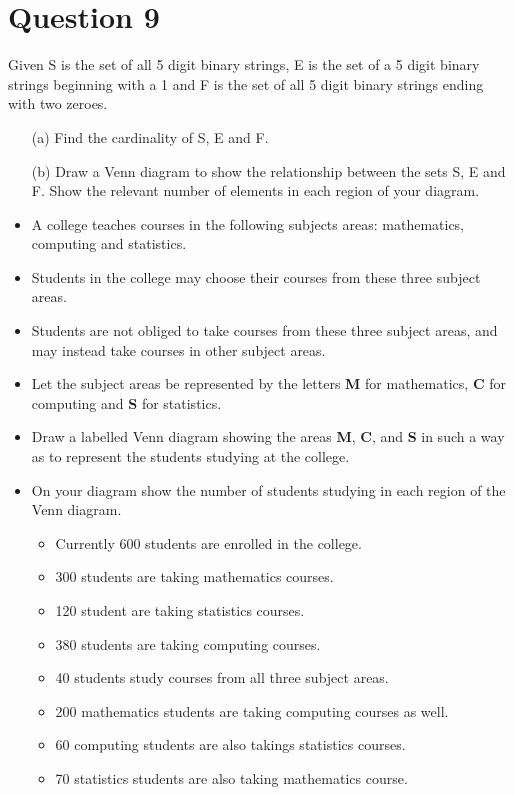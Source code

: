 \documentclass[12pt]{article} %
\begin{document}
\section*{ Question 9 }
Given S is the set of all 5 digit binary strings, E is the set of a 5 digit
binary strings beginning with a 1 and F is the set of all 5 digit binary strings ending
with two zeroes.
\begin{itemize}
	\item[(a)] Find the cardinality of S, E and F.
	\item[(b)] Draw a Venn diagram to show the relationship between the sets S, E and F.
	Show the relevant number of elements in each region of your diagram.
\end{itemize}

\begin{itemize}
	\item A college teaches courses in the following subjects areas: mathematics, computing and statistics.
	\item Students in the college may choose their courses from these three subject areas.
	\item Students are not obliged to take courses from these three subject areas, and may instead take courses in other subject areas. 
	\item  Let the subject areas be represented by the letters \textbf{M} for mathematics, \textbf{C} for computing and \textbf{S} for statistics. \item Draw a labelled Venn diagram showing the areas \textbf{M}, \textbf{C}, and \textbf{S} in such a way as to represent the students studying at the college. \item On your diagram show the number of students studying in each region of the Venn diagram.
	\begin{itemize}
		\item Currently 600
		students are enrolled in the college. 
		\item 300 students are taking mathematics courses.
		\item 120 student are taking statistics courses.
		\item 380 students are taking computing courses. 
		\item 40 students study courses from all three subject
		areas. 
		\item 200 mathematics students are taking computing courses as well. \item 60 computing students
		are also takings statistics courses. \item  70 statistics students are also taking mathematics course.
	\end{itemize}
\end{itemize}
\end{document}
